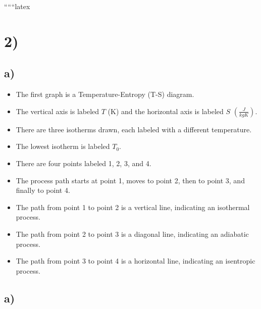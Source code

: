 
``````latex


\section*{2)}

\subsection*{a)}

\begin{itemize}
    \item The first graph is a Temperature-Entropy (T-S) diagram.
    \item The vertical axis is labeled \( T \) (K) and the horizontal axis is labeled \( S \) \(\left(\frac{J}{kgK}\right)\).
    \item There are three isotherms drawn, each labeled with a different temperature.
    \item The lowest isotherm is labeled \( T_0 \).
    \item There are four points labeled 1, 2, 3, and 4.
    \item The process path starts at point 1, moves to point 2, then to point 3, and finally to point 4.
    \item The path from point 1 to point 2 is a vertical line, indicating an isothermal process.
    \item The path from point 2 to point 3 is a diagonal line, indicating an adiabatic process.
    \item The path from point 3 to point 4 is a horizontal line, indicating an isentropic process.
\end{itemize}

\subsection*{a)}

